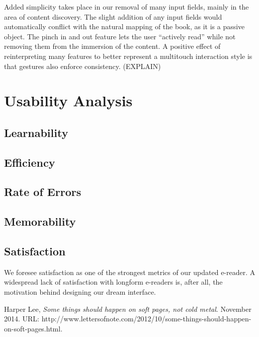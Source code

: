 \documentclass[11pt, oneside]{article}   	%
\begin{document}
Added simplicity takes place in our removal of many input fields, mainly in the area of content discovery. The slight addition of any input fields would automatically conflict with the natural mapping of the book, as it is a passive object. The pinch in and out feature lets the user ``actively read'' while not removing them from the immersion of the content. A positive effect of reinterpreting many features to better represent a multitouch interaction style is that gestures also enforce consistency. (EXPLAIN)

\section{Usability Analysis}

\subsection {Learnability}
\subsection {Efficiency}
\subsection {Rate of Errors}
\subsection {Memorability}
\subsection {Satisfaction}
We foresee satisfaction as one of the strongest metrics of our updated e-reader. A widespread lack of satisfaction with longform e-readers is, after all, the motivation behind designing our dream interface.

\begin{thebibliography}{9}

  Harper Lee,
  \emph{Some things should happen on soft pages, not cold metal}.
  November 2014.
  URL: http://www.lettersofnote.com/2012/10/some-things-should-happen-on-soft-pages.html.


\end{thebibliography}
\end{document}
